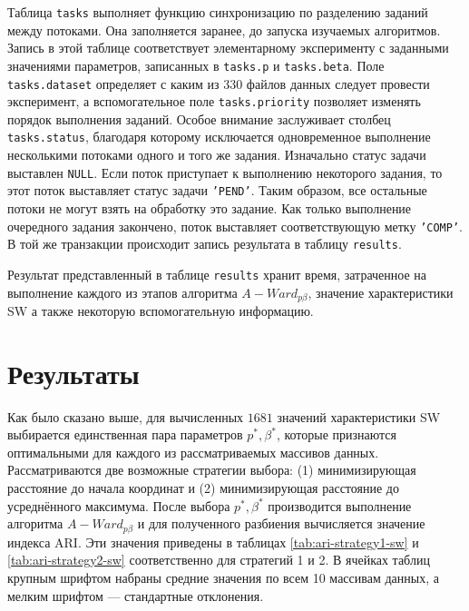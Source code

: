 \documentclass[12pt,twoside,a4paper,tikz,border=5]{refart}
\begin{document}
		Таблица \texttt{tasks} выполняет функцию синхронизацию по разделению заданий между потоками. Она заполняется заранее, до запуска изучаемых алгоритмов. Запись в этой таблице соответствует элементарному эксперименту с заданными значениями параметров, записанных в \texttt{tasks.p} и \texttt{tasks.beta}. Поле \texttt{tasks.dataset} определяет с каким из 330 файлов данных следует провести эксперимент, а вспомогательное поле  \texttt{tasks.priority} позволяет изменять порядок выполнения заданий. Особое внимание заслуживает столбец \texttt{tasks.status}, благодаря которому исключается одновременное выполнение несколькими потоками одного и того же задания. Изначально статус задачи выставлен \texttt{NULL}. Если поток приступает к выполнению некоторого задания, то этот поток выставляет статус задачи \texttt{'PEND'}. Таким образом, все остальные потоки не могут взять на обработку это задание. Как только выполнение очередного задания закончено, поток выставляет соответствующую метку \texttt{'COMP'}. В той же транзакции происходит запись результата в таблицу \texttt{results}.
		
		Результат представленный в таблице \texttt{results} хранит время, затраченное на выполнение каждого из этапов алгоритма $ A-Ward_{p\beta} $, значение характеристики SW а также некоторую вспомогательную информацию.
	
	\section{Результаты}
		Как было сказано выше, для вычисленных $ 1681 $ значений характеристики SW выбирается единственная пара параметров $ p^*, \beta^*  $, которые признаются оптимальными для каждого из рассматриваемых массивов данных. Рассматриваются две возможные стратегии выбора: (1) минимизирующая расстояние до начала координат и (2) минимизирующая расстояние до усреднённого максимума. После выбора $ p^*, \beta^*  $ производится выполнение алгоритма $ A-Ward_{p\beta} $ и для полученного разбиения вычисляется значение индекса ARI. Эти значения приведены в таблицах \ref{tab:ari-strategy1-sw} и \ref{tab:ari-strategy2-sw} соответственно для стратегий 1 и 2. В ячейках таблиц крупным шрифтом набраны средние значения по всем 10 массивам данных, а мелким шрифтом --- стандартные отклонения.
	
\end{document}
